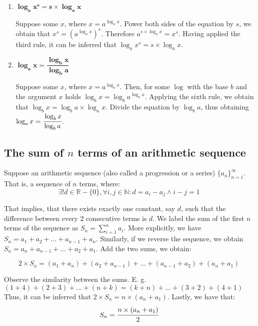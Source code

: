 \documentclass[10pt,a4paper]{article}
\begin{document}
\begin{enumerate}
    \item{$\boldsymbol{\log_a x^{s} = s \times \log_a x}$}  %

    Suppose some $x$, where $x = a^{\log_a x}$. Power both sides of the equation by $s$, we 
    obtain that $x^{s} = (a^{\log_a x})^{s}$. Therefore $a^{s \times \log_a x} = x^{s}$.
    Having applied the third rule, it can be inferred that $\log_a x^{s} = s \times \log_a x$.

    \item{$\boldsymbol{\log_a x = \dfrac{\log_b x}{\log_b a}}$}  %

    Suppose some $x$, where $x = a^{\log_a x}$. Then, for some $\log$ with the base $b$ and the 
    argument $x$ holds $\log_b x = \log_b a^{\log_a x}$. Applying the sixth rule, we obtain that
    $\log_b x = \log_b a \times \log_a x$. Divide the equation by $\log_b a$, thus obtaining
    $\log_a x = \cfrac{\log_b x}{\log_b a}$.

\end{enumerate}
    

\newpage

\subsection{The sum of $n$ terms of an arithmetic sequence}

Suppose an arithmetic sequence (also called a progression or a series) $\{a_{n}\}_{n=1}^{\infty}$. That is, a sequence of $n$ terms, where:
$$\exists! d \in \mathbb{R} - \{0\}, \forall i,j \in \mathbb{N}: d = a_{i} - a_{j} \land i - j = 1$$ 

That implies, that there exists exactly one constant, say $d$, such that the difference between every 2
consecutive terms is $d$. We label the sum of the first $n$ terms of the sequence as $S_{n}=\sum_{i=1}^n a_{i}$.
More explicitly, we have $S_{n} = a_{1} + a_{2} + \dots + a_{n-1} + a_{n}$. Similarly, if we reverse the 
sequence, we obtain $S_{n} = a_{n} + a_{n-1} + \dots + a_{2} + a_{1}$. Add the two sums, we obtain:

$$2 \times S_{n} = (a_{1} + a_{n}) + (a_{2} + a_{n-1}) + \dots + (a_{n-1} + a_{2}) + (a_{n} + a_{1})$$

Observe the similarity between the sums. E. g.
$(1 + 4) + (2 + 3) + \dots + (n + k) = (k + n) + \dots + (3 + 2) + (4 + 1)$
Thus, it can be inferred that $2 \times S_{n} = n \times (a_{n} + a_{1})$.
Lastly, we have that: $$S_{n} = \cfrac{n \times (a_{n} + a_{1})}{2}$$
\end{document}
